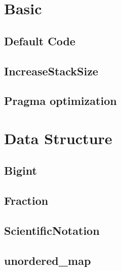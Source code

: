 \documentclass[a4paper,10pt,twocolumn,oneside]{article}
\begin{document}
\pagestyle{fancy}
\fancyfoot{}
\fancyhead[R]{\thepage}
\renewcommand{\headrulewidth}{0.4pt}
\renewcommand{\contentsname}{Contents} 

\scriptsize
\tableofcontents

\newpage

\section{Basic}
\subsection{Default Code}


\subsection{IncreaseStackSize}


\subsection{Pragma optimization}


\section{Data Structure}
\subsection{Bigint}


\subsection{Fraction}


\subsection{ScientificNotation}


\subsection{unordered\_map}

\end{document}
